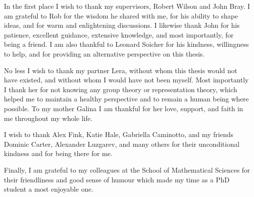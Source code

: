 

\begin{acknowledgements}      %


In the first place I wish to thank my supervisors,
Robert Wilson and John Bray. I am grateful to Rob for the 
wisdom he shared with me, for his ability to shape ideas,
and for warm and enlightening discussions. I likewise thank
John for his patience, excellent guidance, extensive
knowledge, and most importantly, for being a friend. I am also thankful to Leonard Soicher
for his kindness, willingness to help, 
and for providing an alternative perspective
on this thesis.

No less I wish to thank my partner Lera, without whom 
this thesis would not have existed, and without whom I would
have not been myself. Most importantly I thank her for not
knowing any group theory or representation theory, which helped
me to maintain a healthy perspective and to remain a human being
where possible. To my mother Galina I am thankful for her love,
support, and faith in me throughout my whole life. 

I wish to thank Alex Fink, Katie Hale, 
Gabriella Caminotto, and my friends Dominic Carter, Alexander Luzgarev, and many others
for their unconditional kindness and for being there for me. 

Finally, I am grateful to my colleagues
at the School of Mathematical Sciences for their friendliness
and good sense of humour which made my time as a PhD student
a most enjoyable one. 


\end{acknowledgements}


